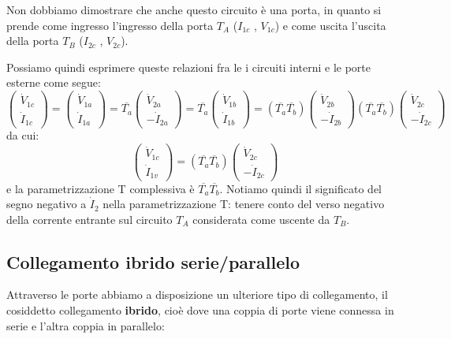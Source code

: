 \documentclass[a4paper,11pt]{article}
\begin{document}
Non dobbiamo dimostrare che anche questo circuito è una porta, in quanto si prende come ingresso l'ingresso della porta $T_A$ ($I_{1c}$ , $V_{1c}$) e come uscita l'uscita della porta $T_B$ ($I_{2c}$ , $V_{2c}$).

Possiamo quindi esprimere queste relazioni fra le i circuiti interni e le porte esterne come segue:
$$
\begin{pmatrix}
	\dot{V}_{1c} \\ \dot{I}_{1c}
\end{pmatrix}
=
\begin{pmatrix}
	\dot{V}_{1a} \\ \dot{I}_{1a}
\end{pmatrix}
=
\overline{T_a}
\begin{pmatrix}
	\dot{V}_{2a} \\ - \dot{I}_{2a}
\end{pmatrix}
=
\overline{T_a}
\begin{pmatrix}
	\dot{V}_{1b} \\ \dot{I}_{1b}
\end{pmatrix}
=
(\overline{T_a} \overline{T_b}) 
\begin{pmatrix}
	\dot{V}_{2b} \\ -\dot{I}_{2b}
\end{pmatrix}
(\overline{T_a} \overline{T_b})
\begin{pmatrix}
	\dot{V}_{2c} \\ -\dot{I}_{2c}
\end{pmatrix}
$$
da cui:
$$
\begin{pmatrix}
	\dot{V}_{1c} \\ \dot{I}_{1v} 
\end{pmatrix}
=
(\overline{T_a} \overline{T_b})
\begin{pmatrix}
	\dot{V}_{2c} \\ -\dot{I}_{2c}
\end{pmatrix}
$$
e la parametrizzazione T complessiva è $\overline{T_a}\overline{T_b}$.
Notiamo quindi il significato del segno negativo a $\dot{I}_2$ nella parametrizzazione T: tenere conto del verso negativo della corrente entrante sul circuito $T_A$ considerata come uscente da $T_B$. 

\subsection{Collegamento ibrido serie/parallelo}
Attraverso le porte abbiamo a disposizione un ulteriore tipo di collegamento, il cosiddetto collegamento \textbf{ibrido}, cioè dove una coppia di porte viene connessa in serie e l'altra coppia in parallelo:
\end{document}
